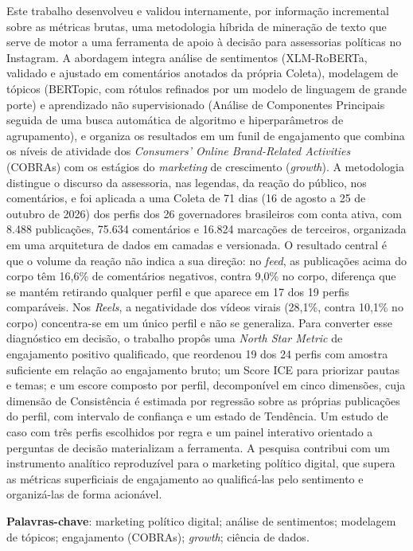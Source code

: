 \setlength{\absparsep}{18pt} %
\begin{resumo}
Este trabalho desenvolveu e validou internamente, por informação incremental sobre as métricas brutas, uma metodologia híbrida de mineração de texto que serve de motor a uma ferramenta de apoio à decisão para assessorias políticas no Instagram. A abordagem integra análise de sentimentos (XLM-RoBERTa, validado e ajustado em comentários anotados da própria Coleta), modelagem de tópicos (BERTopic, com rótulos refinados por um modelo de linguagem de grande porte) e aprendizado não supervisionado (Análise de Componentes Principais seguida de uma busca automática de algoritmo e hiperparâmetros de agrupamento), e organiza os resultados em um funil de engajamento que combina os níveis de atividade dos \textit{Consumers' Online Brand-Related Activities} (COBRAs) com os estágios do \textit{marketing} de crescimento (\textit{growth}). A metodologia distingue o discurso da assessoria, nas legendas, da reação do público, nos comentários, e foi aplicada a uma Coleta de 71 dias (16 de agosto a 25 de outubro de 2026) dos perfis dos 26 governadores brasileiros com conta ativa, com 8.488 publicações, 75.634 comentários e 16.824 marcações de terceiros, organizada em uma arquitetura de dados em camadas e versionada. O resultado central é que o volume da reação não indica a sua direção: no \textit{feed}, as publicações acima do corpo têm 16,6\% de comentários negativos, contra 9,0\% no corpo, diferença que se mantém retirando qualquer perfil e que aparece em 17 dos 19 perfis comparáveis. Nos \textit{Reels}, a negatividade dos vídeos virais (28,1\%, contra 10,1\% no corpo) concentra-se em um único perfil e não se generaliza. Para converter esse diagnóstico em decisão, o trabalho propôs uma \textit{North Star Metric} de engajamento positivo qualificado, que reordenou 19 dos 24 perfis com amostra suficiente em relação ao engajamento bruto; um Score ICE para priorizar pautas e temas; e um escore composto por perfil, decomponível em cinco dimensões, cuja dimensão de Consistência é estimada por regressão sobre as próprias publicações do perfil, com intervalo de confiança e um estado de Tendência. Um estudo de caso com três perfis escolhidos por regra e um painel interativo orientado a perguntas de decisão materializam a ferramenta. A pesquisa contribui com um instrumento analítico reproduzível para o marketing político digital, que supera as métricas superficiais de engajamento ao qualificá-las pelo sentimento e organizá-las de forma acionável.

\vspace{0.5cm}
\noindent
\textbf{Palavras-chave}: marketing político digital; análise de sentimentos; modelagem de tópicos; engajamento (COBRAs); \textit{growth}; ciência de dados.
\end{resumo}
